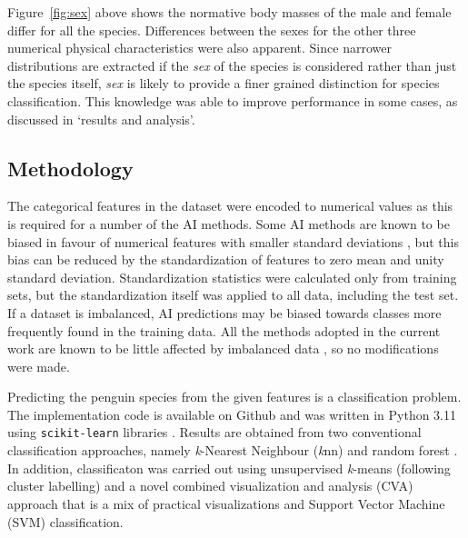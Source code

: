 \documentclass[a4paper, 11pt]{article}
\begin{document}
Figure~\ref{fig:sex} above shows the normative body masses of the male and female differ for all the species. 
Differences between the sexes for the other three numerical physical characteristics were also apparent. 
Since narrower distributions are extracted if the \textit{sex} of the species is considered rather than just the species itself, 
\textit{sex} is likely to provide a finer grained distinction for species classification. 
This knowledge was able to improve performance in some cases, as discussed in `results and analysis'. 

\subsection*{Methodology}

The categorical features in the dataset were encoded to numerical values as this is required for a number of the AI methods. 
Some AI methods are known to be biased in favour of numerical features 
with smaller standard deviations \cite{hastie2009elements}, but this bias can be reduced by the standardization 
of features to zero mean and unity standard deviation. Standardization statistics were calculated only from 
training sets, but the standardization itself was applied to all data, including the test set. 
If a dataset is imbalanced, AI predictions may be biased towards classes more frequently found in the training data. 
All the methods adopted in the current work are known to be little affected by 
imbalanced data \cite{he2009learning}, so no modifications were made.

Predicting the penguin species from the given features is a classification problem. 
The implementation code is available on Github \cite{TimAIRepo} and was written in Python 3.11 \cite{python311} 
using \texttt{scikit-learn} libraries \cite{scikit-learn}.
Results are obtained from two conventional classification approaches, 
namely \textit{k}-Nearest Neighbour (\textit{k}nn) \cite{bishop2006pattern} and random forest \cite{breiman2001random}.
In addition, classificaton was carried out using unsupervised \textit{k}-means (following cluster labelling) \cite{tan2005introduction} 
and a novel combined visualization and analysis (CVA) approach that is a mix of 
practical visualizations and Support Vector Machine (SVM) classification.
\end{document}
